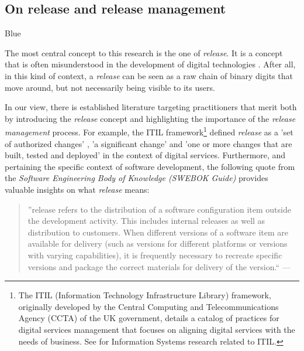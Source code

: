 \documentclass[dvipsnames]{interact}
\theoremstyle{plain}\newtheorem{theorem}{Theorem}[section]
\theoremstyle{definition}
\theoremstyle{remark}
\begin{document}
\subsection{On release and release management}




\begin{color}{Blue}

The most central concept to this research is the one of \textit{release}. It is a concept that is often misunderstood in the development of digital technologies \citep{HoekHall_et_al1997,LahtelaJantti2011,Howard2016}. After all, in this kind of context, a \textit{release} can be seen as a raw chain of binary digits that move around, but not necessarily being visible to its users.

In our view, there is established literature targeting practitioners that merit both by introducing the \textit{release} concept and highlighting the importance of the \textit{release management} process. 
For example, the ITIL framework\footnote{The ITIL (Information Technology Infrastructure Library) framework, originally  developed by the Central Computing and Telecommunications Agency (CCTA) of the UK government, details a catalog of practices for digital services management that focuses on aligning digital services with the needs of business. See \citep{McNaughtonRay_et_al2010,GorlaSomers_et_al2010} for Information Systems research related to ITIL.}  defined \textit{release} as a 'set of authorized changes' \citep{GovernmentCommerce2005},  'a significant change' \citep{Bon2011} and 'one or more changes that are built, tested and deployed' \citep{Davies2016} in the context of digital services. 
Furthermore, and pertaining the specific context of software development, the following quote 
from the \textit{ Software Engineering Body of Knowledge (SWEBOK Guide)}
provides valuable insights on what \textit{release} means: 


\begin{quotation}
 ''release refers  to  the  distribution  of  a  software  configuration  item outside the development activity. 
This  includes  internal  releases as well as distribution to customers. When  different versions of a software item are available  for  delivery  (such  as  versions  for  different  platforms  or  versions  with  varying  capabilities),  it is  frequently necessary to recreate specific versions  and  package  the  correct  materials  for  delivery  of   the version.``  ---  \citep{Society2014}
\end{quotation}



\end{color}
\end{document}
